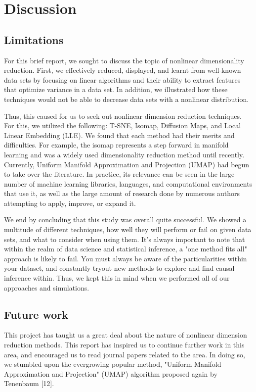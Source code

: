 \documentclass[12pt]{article}
\begin{document}
\newpage

\section{Discussion} \label{sec:discussion}

\hspace{5mm}


\subsection{Limitations}
\hspace{5mm}For this brief report, we sought to discuss the topic of nonlinear dimensionality reduction. First, we effectively reduced, displayed, and learnt from well-known data sets by focusing on linear algorithms and their ability to extract features that optimize variance in a data set. In addition, we illustrated how these techniques would not be able to decrease data sets with a nonlinear distribution.

Thus, this caused for us to seek out nonlinear dimension reduction techniques. For this, we utilized the following: T-SNE, Isomap, Diffusion Maps, and Local Linear Embedding (LLE). We found that each method had their merits and difficulties. For example, the isomap represents a step forward in manifold learning and was a widely used dimensionality reduction method until recently. Currently, Uniform Manifold Approximation and Projection (UMAP) had begun to take over the literature. In practice, its relevance can be seen in the large number of machine learning libraries, languages, and computational environments that use it, as well as the large amount of research done by numerous authors attempting to apply, improve, or expand it.

We end by concluding that this study was overall quite successful. We showed a multitude of different techniques, how well they will perform or fail on given data sets, and what to consider when using them. It's always important to note that within the realm of data science and statistical inference, a "one method fits all" approach is likely to fail. You must always be aware of the particularities within your dataset, and constantly tryout new methods to explore and find causal inference within. Thus, we kept this in mind when we performed all of our approaches and simulations.

\subsection{Future work}
\hspace{5mm}This project has taught us a great deal about the nature of nonlinear dimension reduction methods. This report has inspired us to continue further work in this area, and encouraged us to read journal papers related to the area. In doing so, we stumbled upon the evergrowing popular method, "Uniform Manifold Approximation and Projection" (UMAP) algorithm proposed again by Tenenbaum [12].
\end{document}
